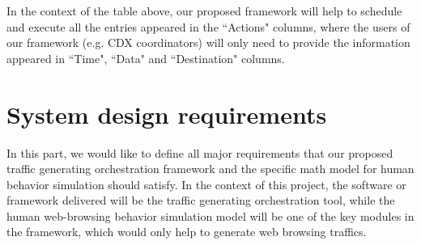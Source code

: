 \documentclass[12pt]{report}
\begin{document}
In the context of the table above, our proposed framework will help to schedule and execute all the entries appeared in the ``Actions" columns, where the users of our framework (e.g. CDX coordinators) will only need to provide the information appeared in ``Time", ``Data" and ``Destination" columns.

\section{System design requirements}

In this part, we would like to define all major requirements that our proposed traffic generating orchestration framework and the specific math model for human behavior simulation should satisfy. In the context of this project, the software or framework delivered will be the traffic generating orchestration tool, while the human web-browsing behavior simulation model will be one of the key modules in the framework, which would only help to generate web browsing traffics.
\end{document}
